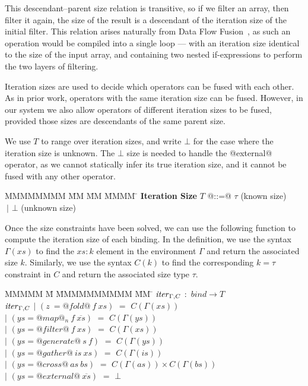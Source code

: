 This descendant--parent size relation is transitive, so if we filter an array, then filter it again, the size of the result is a descendant of the iteration size of the initial filter. This relation arises naturally from Data Flow Fusion~\cite{lippmeier2013flow}, as such an operation would be compiled into a single loop --- with an iteration size identical to the size of the input array, and containing two nested if-expressions to perform the two layers of filtering.

Iteration sizes are used to decide which operators can be fused with each other. As in prior work, operators with the same iteration size can be fused. However, in our system we also allow operators of different iteration sizes to be fused, provided those sizes are descendants of the same parent size.

We use $T$ to range over iteration sizes, and write $\bot$ for the case where the iteration size is unknown. The $\bot$ size is needed to handle the @external@ operator, as we cannot statically infer its true iteration size, and it cannot be fused with any other operator.

\begin{tabbing}
MMMMMMMM \= MM       \= MM \= MMMM \= \kill
\textbf{Iteration Size}
 \> $T$         \> @::=@  \> $\tau$        \> (known size) \\
 \>             \> $~|$   \> $\bot$     \> (unknown size) \\
\end{tabbing}

Once the size constraints have been solved, we can use the following function to compute the iteration size of each binding. In the definition, we use the syntax $\Gamma(xs)$ to find the $xs : k$ element in the environment $\Gamma$ and return the associated size $k$. Similarly, we use the syntax $C(k)$ to find the corresponding $k = \tau$ constraint in $C$ and return the associated size type $\tau$.


\begin{tabbing}
MMMMM \= M \= MMMMMMMMMM \= MM \= \kill
$\mathit{iter}_{\Gamma,C}$  
        \>$:$\> $bind \rightarrow T$ 
\\[1ex]
$\mathit{iter}_{\Gamma,C}$
        \> $|$  \> $(z~ = @fold@~ f~xs)$     
                \> $=$ \> $C(\Gamma(xs))$ 
\\
        \> $|$  \> $(ys = @map@_n~f~\overline{xs})$
                \> $=$ \> $C(\Gamma(ys))$ 
\\
        \> $|$  \> $(ys = @filter@~f~xs)$    
                \> $=$ \> $C(\Gamma(xs))$ 
\\
        \> $|$  \> $(ys = @generate@~s~f)$  
                \> $=$ \> $C(\Gamma(ys))$ 
\\
        \> $|$  \> $(ys = @gather@~is~xs)$    
                \> $=$ \> $C(\Gamma(is))$ 
\\
        \> $|$  \> $(ys = @cross@~as~bs)$     
                \> $=$ \> $C(\Gamma(as)) \times C(\Gamma(bs))$ 
\\
        \> $|$  \> $(ys = @external@~\overline{xs})$  
                \> $=$ \> $\bot$ 
\\
\end{tabbing}


